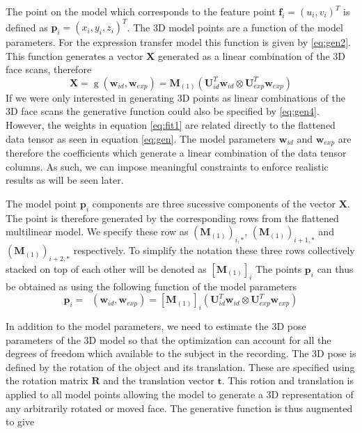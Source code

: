 \documentclass[11pt,a4paper]{report}
\begin{document}
The point on the model
which corresponds to the feature point $\mathbf{f}_i = (u_i,v_i)^T$ is defined as $\mathbf{p}_i = (x_i,y_i,z_i)^T$. The 3D model
points are a function of the model parameters. For the expression transfer model
this function is given by \ref{eq:gen2}. This function generates a vector $\mathbf{X}$
generated as a linear combination of the 3D face scans, therefore 
\begin{equation}\label{eq:fit1}
\mathbf{X} = \mathop{g}(\mathbf{w}_{id},\mathbf{w}_{exp})= \mathbf{M}_{(1)}(\mathbf{U}_{id}^T\mathbf{w}_{id} \otimes
\mathbf{U}_{exp}^T\mathbf{w}_{exp})
\end{equation}
If we were only interested in
generating 3D points as linear combinations of the 3D face scans 
the generative function could also be specified by \ref{eq:gen4}. However, the
weights in equation \ref{eq:fit1} are related directly to the flattened data
tensor as seen in equation \ref{eq:gen}. The model parameters $\mathbf{w}_{id}$
and $\mathbf{w}_{exp}$ are therefore the coefficients which generate a
linear combination of the data tensor columns. As such, we can impose meaningful
constraints to enforce realistic results as will be seen later. 

The model point $\mathbf{p}_i$ components are three sucessive components of the vector
$\mathbf{X}$. The point is therefore
generated by the corresponding rows from the flattened multilinear
model. We specify these row as $(\mathbf{M}_{(1)})_{i,*}$,
$(\mathbf{M}_{(1)})_{i+1,*}$ and $(\mathbf{M}_{(1)})_{i+2,*}$ respectively. To
simplify the notation these three rows collectively stacked on top of each other
will be denoted as
$[\mathbf{M}_{(1)}]_{i}$ The points $\mathbf{p}_i$ can thus be
obtained as using the following function of the model parameters
\begin{equation}\label{eq:fit2}
\mathbf{p}_i = \mathop{g_i}(\mathbf{w}_{id},\mathbf{w}_{exp})
= [\mathbf{M}_{(1)}]_{i}(\mathbf{U}_{id}^T\mathbf{w}_{id} \otimes \mathbf{U}_{exp}^T\mathbf{w}_{exp})
\end{equation}

In addition to the model parameters, we need
to estimate the 3D pose parameters of the 3D model so that the optimization can
account for all the degrees of freedom which available to the subject in the recording. The 3D
pose is defined by the rotation of the object and its translation. These are
specified using the rotation matrix $\mathbf{R}$ and the translation vector
$\mathbf{t}$. This rotion and translation is applied to all model points
allowing the model to generate a 3D representation of any arbitrarily rotated or
 moved face. The generative function is thus augmented to give
\end{document}
